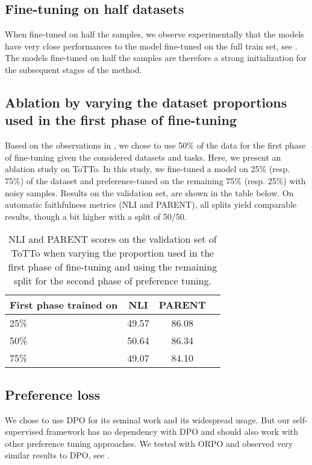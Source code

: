 \subsection{Fine-tuning on half datasets}
\label{app:half_ft}
When fine-tuned on half the samples, we observe experimentally that the models have very close performances to the model fine-tuned on the full train set, see . The models fine-tuned on half the samples are therefore a strong initialization for the subsequent stages of the method.
\label{app:sft-05}


\subsection{Ablation by varying the dataset proportions used in the first phase of fine-tuning}
Based on the observations in , we chose to use 50\% of the data for the first phase of fine-tuning given the considered datasets and tasks. Here, we present an ablation study on ToTTo. In this study, we fine-tuned a model on 25\% (resp. 75\%) of the dataset and preference-tuned on the remaining 75\% (resp. 25\%) with noisy samples. Results on the validation set, are shown in the table below. On automatic faithfulness metrics (NLI and PARENT), all splits yield comparable results, though a bit higher with a split of 50/50.
\begin{table}[h]
\centering
\begin{tabular}{lccc}
\toprule
\textbf{First phase trained on} &\textbf{NLI} & \textbf{PARENT} \\
\midrule
25\% &  49.57 & 86.08 \\
50\% &  50.64 & 86.34 \\
75\% & 49.07 & 84.10 \\
\bottomrule
\end{tabular}
\caption{NLI and PARENT scores on the validation set of ToTTo when varying the proportion used in the first phase of fine-tuning and using the remaining split for the second phase of preference tuning.}
\label{tab:ablation_ft}
\end{table}


\subsection{Preference loss}
We chose to use DPO \citep{dpo} for its seminal work and its widespread usage.  But our self-supervised framework has no dependency with DPO and should also work with other preference tuning approaches. We tested with ORPO \citep{orpo} and observed very similar results to DPO, see .
\label{app:orpo}

